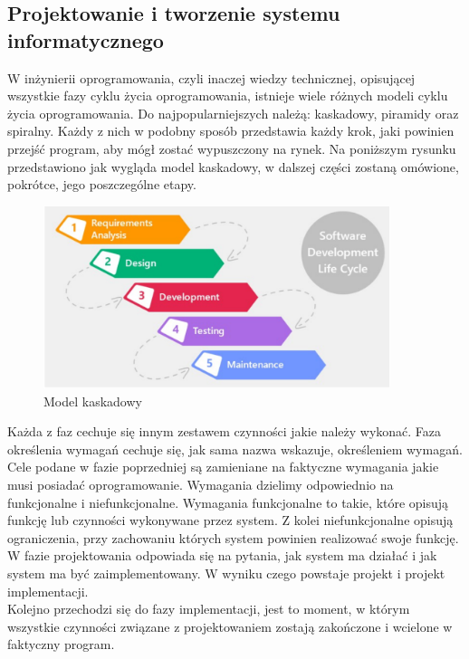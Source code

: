\documentclass[12pt]{article}
\begin{document}
\begin{sloppypar}
{  \subsection{Projektowanie i tworzenie systemu informatycznego}
  {
    W inżynierii oprogramowania, czyli inaczej wiedzy technicznej, opisującej wszystkie fazy cyklu życia oprogramowania, istnieje wiele różnych modeli 
    cyklu życia oprogramowania. Do najpopularniejszych należą: kaskadowy, piramidy oraz spiralny. Każdy z nich w podobny sposób przedstawia każdy krok, 
    jaki powinien przejść program, aby mógł zostać wypuszczony na rynek. Na poniższym rysunku przedstawiono jak wygląda model kaskadowy, w dalszej części zostaną 
    omówione, pokrótce, jego poszczególne etapy.
    \begin{figure}[H]
      \centering
      \includegraphics[width=0.9\textwidth]{model_kaskadowy}
      \caption{Model kaskadowy \cite{cascade}}
      \label{fig:cascade}
    \end{figure}
    Każda z faz cechuje się innym zestawem czynności jakie należy wykonać. 
    Faza określenia wymagań cechuje się, jak sama nazwa wskazuje, określeniem wymagań. Cele podane w fazie poprzedniej są zamieniane na faktyczne wymagania 
    jakie musi posiadać oprogramowanie. Wymagania dzielimy odpowiednio na funkcjonalne i niefunkcjonalne. 
    Wymagania funkcjonalne to takie, które opisują funkcję lub czynności wykonywane przez system. 
    Z kolei niefunkcjonalne opisują ograniczenia, przy zachowaniu których system powinien realizować swoje funkcję.\\
    W fazie projektowania odpowiada się na pytania, jak system ma działać i jak system ma być zaimplementowany. W wyniku czego powstaje projekt i projekt implementacji.\\
    Kolejno przechodzi się do fazy implementacji, jest to moment, w którym wszystkie czynności związane z projektowaniem zostają zakończone i wcielone w faktyczny program.\\
}}
\end{sloppypar}
\end{document}
